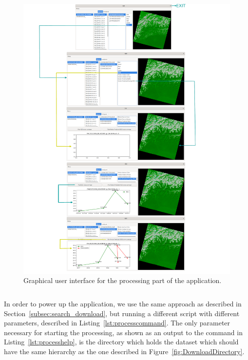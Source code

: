 \documentclass[12pt, a4paper]{report}
\begin{document}
	\begin{figure}[h!]
		\centering
		\includegraphics[width=\columnwidth]{../images/GUI.png}
		\caption{Graphical user interface for the processing part of the application.}
		\label{fig:gui}
	\end{figure}

	\begin{lstlisting}[caption={Help command for processing.},label={lst:processcommand},language=Bash]
	% bash -x run_process.sh --help
	\end{lstlisting}

	In order to power up the application, we use the same approach as described in Section~\ref{subsec:search_download}, but running a different script with different parameters, described in Listing~\ref{lst:processcommand}. The only parameter necessary for starting the processing, as shown as an output to the command in Listing~\ref{lst:processhelp}, is the directory which holds the dataset which should have the same hierarchy as the one described in Figure~\ref{fig:DownloadDirectory}.
\end{document}
